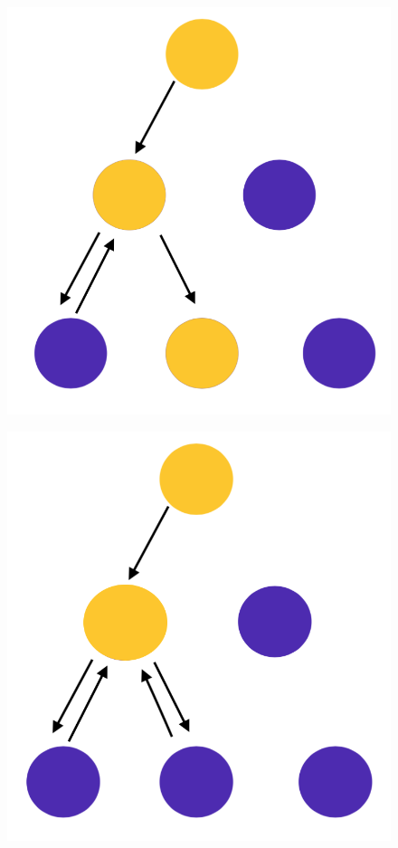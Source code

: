 \documentclass[10pt,a4paper]{article}
\begin{document}
\begin{figure}[h!]
\centering
\begin{minipage}{.3\textwidth}
  \includegraphics[width=.8\linewidth]{images/di-sch4.png}
  \label{fig:di-sch4}
\end{minipage}%
\begin{minipage}{.3\textwidth}
  \includegraphics[width=.8\linewidth]{images/di-sch5.png}
  \label{fig:di-sch5}
\end{minipage}%
\begin{minipage}{.3\textwidth}

\end{minipage}
\end{figure}
\end{document}

